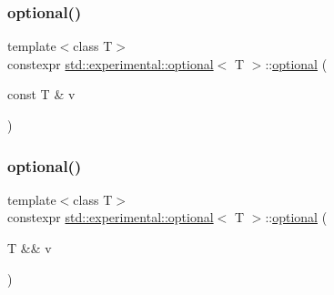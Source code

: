 \subsubsection{\texorpdfstring{optional()}{optional()}\hspace{0.1cm}{\footnotesize\ttfamily [5/8]}}
{\footnotesize\ttfamily template$<$class T$>$ \\
constexpr \hyperlink{classstd_1_1experimental_1_1optional}{std\+::experimental\+::optional}$<$ T $>$\+::\hyperlink{classstd_1_1experimental_1_1optional}{optional} (\begin{DoxyParamCaption}\item[{const T \&}]{v }\end{DoxyParamCaption})\hspace{0.3cm}{\ttfamily [inline]}}

\mbox{\label{classstd_1_1experimental_1_1optional_a0eabb5769fc6c11a61bc004b314db7d1}} 
\subsubsection{\texorpdfstring{optional()}{optional()}\hspace{0.1cm}{\footnotesize\ttfamily [6/8]}}
{\footnotesize\ttfamily template$<$class T$>$ \\
constexpr \hyperlink{classstd_1_1experimental_1_1optional}{std\+::experimental\+::optional}$<$ T $>$\+::\hyperlink{classstd_1_1experimental_1_1optional}{optional} (\begin{DoxyParamCaption}\item[{T \&\&}]{v }\end{DoxyParamCaption})\hspace{0.3cm}{\ttfamily [inline]}}

\mbox{\label{classstd_1_1experimental_1_1optional_ab82edfd1f44d875a8bf3246eaed393b6}} 
